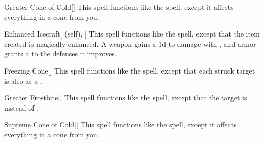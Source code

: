 \lowercase{\hypertarget{spell:Greater Cone of Cold}{}}\label{spell:Greater Cone of Cold}
\begin{freeability}[\nth{3}]{\hypertarget{spell:Greater Cone of Cold}{Greater Cone of Cold}}[]
This spell functions like the  spell, except it affects everything in a \arealarge cone from you.
\end{freeability}
\vspace{0.25em}



\lowercase{\hypertarget{spell:Enhanced Icecraft}{}}\label{spell:Enhanced Icecraft}
\begin{attuneability}[\nth{4}]{\hypertarget{spell:Enhanced Icecraft}{Enhanced Icecraft}}[ (self), ]
This spell functions like the  spell, except that the item created is magically enhanced.
A weapon gains a \plus1d  to damage with , and armor grants a   to the defenses it improves.
\end{attuneability}
\vspace{0.25em}



\lowercase{\hypertarget{spell:Freezing Cone}{}}\label{spell:Freezing Cone}
\begin{freeability}[\nth{4}]{\hypertarget{spell:Freezing Cone}{Freezing Cone}}[]
This spell functions like the  spell, except that each struck target is also  as a .
\end{freeability}
\vspace{0.25em}



\lowercase{\hypertarget{spell:Greater Frostbite}{}}\label{spell:Greater Frostbite}
\begin{freeability}[\nth{5}]{\hypertarget{spell:Greater Frostbite}{Greater Frostbite}}[]
This spell functions like the  spell, except that the target is  instead of .
\end{freeability}
\vspace{0.25em}



\lowercase{\hypertarget{spell:Supreme Cone of Cold}{}}\label{spell:Supreme Cone of Cold}
\begin{freeability}[\nth{5}]{\hypertarget{spell:Supreme Cone of Cold}{Supreme Cone of Cold}}[]
This spell functions like the  spell, except it affects everything in a \areahuge cone from you.
\end{freeability}
\vspace{0.25em}


